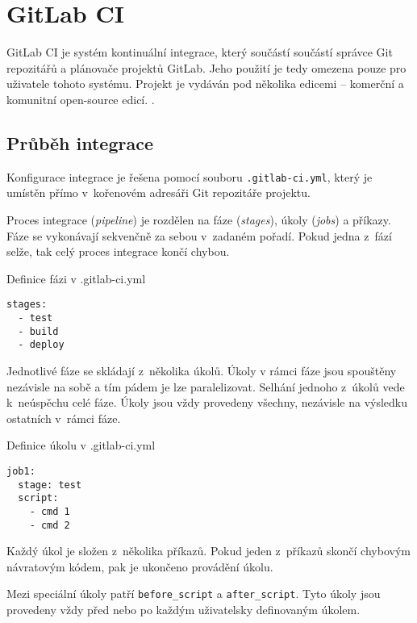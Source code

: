 \section{GitLab CI}

GitLab CI je systém kontinuální integrace, který součástí součástí správce Git repozitářů a plánovače projektů GitLab.
Jeho použití je tedy omezena pouze pro uživatele tohoto systému.
Projekt je vydáván pod několika edicemi -- komerční a komunitní open-source edicí. \cite{gitlab_ce}.

\subsection{Průběh integrace}


Konfigurace integrace je řešena pomocí souboru \verb|.gitlab-ci.yml|, který je umístěn přímo v~kořenovém adresáři Git repozitáře projektu.

Proces integrace (\textit{pipeline}) je rozdělen na fáze (\textit{stages}), úkoly (\textit{jobs}) a příkazy.
Fáze se vykonávají sekvenčně za sebou v~zadaném pořadí.
Pokud jedna z~fází selže, tak celý proces integrace končí chybou.

\begin{listing}[ht]
\caption{Definice fázi v .gitlab-ci.yml}
\begin{verbatim}
stages:
  - test
  - build
  - deploy
\end{verbatim}
\end{listing}

Jednotlivé fáze se skládají z~několika úkolů.
Úkoly v rámci fáze jsou spouštěny nezávisle na sobě a tím pádem je lze paralelizovat.
Selhání jednoho z~úkolů vede k~neúspěchu celé fáze.
Úkoly jsou vždy provedeny všechny, nezávisle na výsledku ostatních v~rámci fáze.

\begin{listing}[ht]
\caption{Definice úkolu v .gitlab-ci.yml}
\begin{verbatim}
job1:
  stage: test
  script:
    - cmd 1
    - cmd 2
\end{verbatim}
\end{listing}

Každý úkol je složen z~několika příkazů.
Pokud jeden z~příkazů skončí chybovým návratovým kódem, pak je ukončeno provádění úkolu.

Mezi speciální úkoly patří \verb|before_script| a \verb|after_script|.
Tyto úkoly jsou provedeny vždy před nebo po každým uživatelsky definovaným úkolem.

